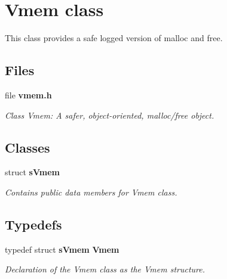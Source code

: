 \section{Vmem class}
\label{a00029}


This class provides a safe logged version of malloc and free.  


\subsection*{Files}
\begin{DoxyCompactItemize}
\item 
file {\bf vmem.\+h}
\begin{DoxyCompactList}\small\item\em Class Vmem\+: A safer, object-\/oriented, malloc/free object. \end{DoxyCompactList}\end{DoxyCompactItemize}
\subsection*{Classes}
\begin{DoxyCompactItemize}
\item 
struct {\bf s\+Vmem}
\begin{DoxyCompactList}\small\item\em Contains public data members for Vmem class. \end{DoxyCompactList}\end{DoxyCompactItemize}
\subsection*{Typedefs}
\begin{DoxyCompactItemize}
\item 
typedef struct {\bf s\+Vmem} {\bf Vmem}
\begin{DoxyCompactList}\small\item\em Declaration of the Vmem class as the Vmem structure. \end{DoxyCompactList}\end{DoxyCompactItemize}
